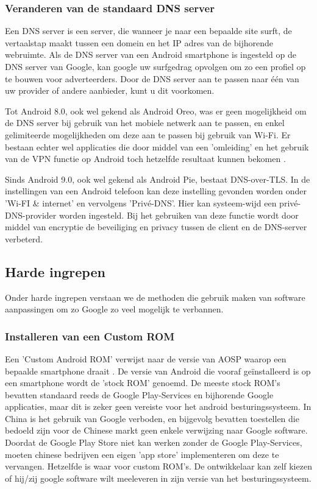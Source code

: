 \subsubsection{Veranderen van de standaard DNS server}
Een DNS server is een server, die wanneer je naar een bepaalde site surft, de vertaalstap maakt tussen een domein en het IP adres van de bijhorende webruimte. Als de DNS server van een Android smartphone is ingesteld op de DNS server van Google, kan google uw surfgedrag opvolgen om zo een profiel op te bouwen voor adverteerders. Door de DNS server aan te passen naar één van uw provider of andere aanbieder, kunt u dit voorkomen.

Tot Android 8.0, ook wel gekend als Android Oreo, was er geen mogelijkheid om de DNS server bij gebruik van het mobiele netwerk aan te passen, en enkel gelimiteerde mogelijkheden om deze aan te passen bij gebruik van Wi-Fi. Er bestaan echter wel applicaties die door middel van een 'omleiding' en het gebruik van de VPN functie op Android toch hetzelfde resultaat kunnen bekomen \autocite{knight_degoogle}. 

Sinds Android 9.0, ook wel gekend als Android Pie, bestaat DNS-over-TLS. In de instellingen van een Android telefoon kan deze instelling gevonden worden onder 'Wi-FI \& internet' en vervolgens 'Privé-DNS'. Hier kan systeem-wijd een privé-DNS-provider worden ingesteld. Bij het gebruiken van deze functie wordt door middel van encryptie de beveiliging en privacy tussen de client en de DNS-server verbeterd. \autocite{google_dns-tls}

\subsection{Harde ingrepen}

Onder harde ingrepen verstaan we de methoden die gebruik maken van software aanpassingen om zo Google zo veel mogelijk te verbannen.

\subsubsection{Installeren van een Custom ROM}
Een 'Custom Android ROM' verwijst naar de versie van AOSP waarop een bepaalde smartphone draait \autocite{custom-rom}. De versie van Android die vooraf geïnstalleerd is op een smartphone wordt de 'stock ROM' genoemd. De meeste stock ROM's bevatten standaard reeds de Google Play-Services en bijhorende Google applicaties, maar dit is zeker geen vereiste voor het android besturingssysteem. In China is het gebruik van Google verboden, en bijgevolg bevatten toestellen die bedoeld zijn voor de Chinese markt geen enkele verwijzing naar Google software. Doordat de Google Play Store niet kan werken zonder de Google Play-Services, moeten chinese bedrijven een eigen 'app store' implementeren om deze te vervangen. Hetzelfde is waar voor custom ROM's. De ontwikkelaar kan zelf kiezen of hij/zij google software wilt meeleveren in zijn versie van het besturingssysteem.

